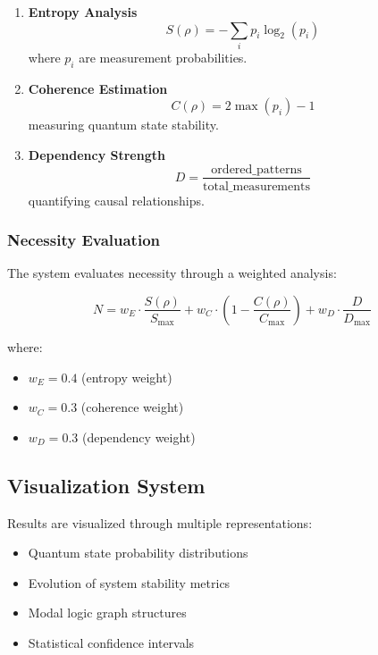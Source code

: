 \begin{enumerate}
    \item \textbf{Entropy Analysis}
    \begin{equation}
        S(\rho) = -\sum_i p_i \log_2(p_i)
    \end{equation}
    where $p_i$ are measurement probabilities.
    
    \item \textbf{Coherence Estimation}
    \begin{equation}
        C(\rho) = 2\max(p_i) - 1
    \end{equation}
    measuring quantum state stability.
    
    \item \textbf{Dependency Strength}
    \begin{equation}
        D = \frac{\text{ordered\_patterns}}{\text{total\_measurements}}
    \end{equation}
    quantifying causal relationships.
\end{enumerate}

\subsubsection{Necessity Evaluation}
The system evaluates necessity through a weighted analysis:

\begin{equation}
    N = w_E\cdot\frac{S(\rho)}{S_{\text{max}}} + w_C\cdot(1-\frac{C(\rho)}{C_{\text{max}}}) + w_D\cdot\frac{D}{D_{\text{max}}}
\end{equation}

where:
\begin{itemize}
    \item $w_E = 0.4$ (entropy weight)
    \item $w_C = 0.3$ (coherence weight)
    \item $w_D = 0.3$ (dependency weight)
\end{itemize}

\subsection{Visualization System}
Results are visualized through multiple representations:

\begin{itemize}
    \item Quantum state probability distributions
    \item Evolution of system stability metrics
    \item Modal logic graph structures
    \item Statistical confidence intervals
\end{itemize}

